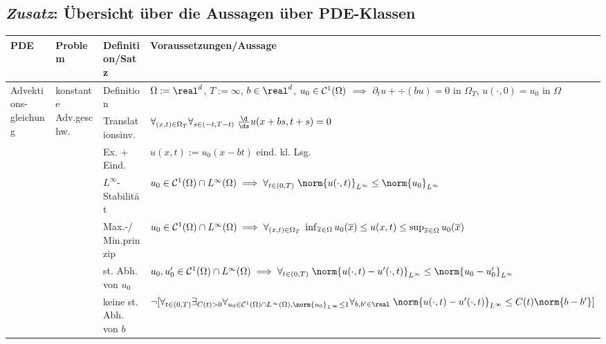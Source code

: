 \begin{landscape}
    \section{%
        \emph{Zusatz}: Übersicht über die Aussagen über PDE-Klassen%
    }

    \footnotesize

    \begin{tabular}{p{20mm}p{20mm}p{30mm}p{169mm}}
        \toprule

        \textbf{PDE}&
        \textbf{Problem}&
        \textbf{Definition/Satz}&
        \textbf{Voraussetzungen/Aussage}\\

        \midrule

        \multirow{9}{20mm}{Advektions-gleichung}&
        \multirow{7}{20mm}{konstante Adv.geschw.}&
        Definition&
        $\Omega := \real^d$, $T := \infty$, $b \in \real^d$, $u_0 \in \mathcal{C}^1(\Omega)$
        $\implies$
        $\partial_t u + \div(bu) = 0$ in $\Omega_T$, $u(\cdot, 0) = u_0$ in $\Omega$\\

        &&Translationsinv.&
        $\forall_{(x, t) \in \Omega_T} \forall_{s \in (-t, T-t)}\;
        \frac{\d}{\ds} u(x + bs, t + s) = 0$\\

        &&Ex. + Eind.&
        $u(x, t) := u_0(x - bt)$ eind. kl. Lsg.\\

        &&$L^\infty$-Stabilität&
        $u_0 \in \C^1(\Omega) \cap L^\infty(\Omega) \implies
        \forall_{t \in (0, T)}\; \norm{u(\cdot, t)}_{L^\infty} \le \norm{u_0}_{L^\infty}$\\

        &&Max.-/Min.prinzip&
        $u_0 \in \mathcal{C}^1(\Omega) \cap L^\infty(\Omega) \implies
        \forall_{(x, t) \in \Omega_T}\;
        \inf_{\overline{x} \in \Omega} u_0(\overline{x}) \le u(x, t) \le
        \sup_{\overline{x} \in \Omega} u_0(\overline{x})$\\

        &&st. Abh. von $u_0$&
        $u_0, u_0' \in \C^1(\Omega) \cap L^\infty(\Omega) \implies
        \forall_{t \in (0, T)}\;
        \norm{u(\cdot, t) - u'(\cdot, t)}_{L^\infty} \le \norm{u_0 - u_0'}_{L^\infty}$\\

        &&keine st. Abh. von $b$&
        $\lnot[\forall_{t \in (0, T)} \exists_{C(t) > 0}
        \forall_{u_0 \in \C^1(\Omega) \cap L^\infty(\Omega), \norm{u_0}_{L^\infty} \le 1}
        \forall_{b, b' \in \real}\;
        \norm{u(\cdot, t) - u'(\cdot, t)}_{L^\infty} \le C(t) \norm{b - b'}]$\\


\end{tabular}
\end{landscape}
